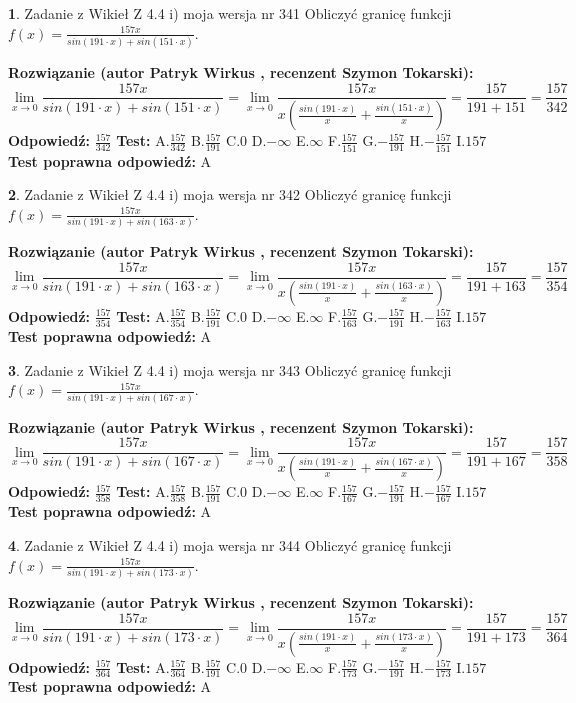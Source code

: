 \documentclass[12pt, a4paper]{article}
\theoremstyle{definition} %
\newtheorem{zad}{}
\newcommand{\zadStart}[1]{\begin{zad}#1\newline}
\newcommand{\zadStop}{\end{zad}}
\newcommand{\rozwStart}[2]{\noindent \textbf{Rozwiązanie (autor #1 , recenzent #2): }\newline}
\newcommand{\rozwStop}{\newline}
\newcommand{\odpStart}{\noindent \textbf{Odpowiedź:}\newline}
\newcommand{\odpStop}{\newline}
\newcommand{\testStart}{\noindent \textbf{Test:}\newline}
\newcommand{\testStop}{\newline}
\newcommand{\kluczStart}{\noindent \textbf{Test poprawna odpowiedź:}\newline}
\newcommand{\kluczStop}{\newline}
\begin{document}
\zadStart{Zadanie z Wikieł Z 4.4 i) moja wersja nr 341}
Obliczyć granicę funkcji $f(x)=\frac{157x}{sin(191\cdot x) +sin(151\cdot x)}$.
\zadStop
\rozwStart{Patryk Wirkus}{Szymon Tokarski}
$$\lim\limits_{x\to 0}\frac{157x}{sin(191\cdot x) +sin(151\cdot x)}=\lim\limits_{x\to 0}\frac{157x}{x(\frac{sin(191\cdot x)}{x}+\frac{sin(151\cdot x)}{x})}=\frac{157}{191+151} = \frac{157}{342}$$
\rozwStop
\odpStart
$\frac{157}{342}$
\odpStop
\testStart
A.$\frac{157}{342}$
B.$\frac{157}{191}$
C.$0$
D.$-\infty$
E.$\infty$
F.$\frac{157}{151}$
G.$-\frac{157}{191}$
H.$-\frac{157}{151}$
I.$157$
\testStop
\kluczStart
A
\kluczStop



\zadStart{Zadanie z Wikieł Z 4.4 i) moja wersja nr 342}
Obliczyć granicę funkcji $f(x)=\frac{157x}{sin(191\cdot x) +sin(163\cdot x)}$.
\zadStop
\rozwStart{Patryk Wirkus}{Szymon Tokarski}
$$\lim\limits_{x\to 0}\frac{157x}{sin(191\cdot x) +sin(163\cdot x)}=\lim\limits_{x\to 0}\frac{157x}{x(\frac{sin(191\cdot x)}{x}+\frac{sin(163\cdot x)}{x})}=\frac{157}{191+163} = \frac{157}{354}$$
\rozwStop
\odpStart
$\frac{157}{354}$
\odpStop
\testStart
A.$\frac{157}{354}$
B.$\frac{157}{191}$
C.$0$
D.$-\infty$
E.$\infty$
F.$\frac{157}{163}$
G.$-\frac{157}{191}$
H.$-\frac{157}{163}$
I.$157$
\testStop
\kluczStart
A
\kluczStop



\zadStart{Zadanie z Wikieł Z 4.4 i) moja wersja nr 343}
Obliczyć granicę funkcji $f(x)=\frac{157x}{sin(191\cdot x) +sin(167\cdot x)}$.
\zadStop
\rozwStart{Patryk Wirkus}{Szymon Tokarski}
$$\lim\limits_{x\to 0}\frac{157x}{sin(191\cdot x) +sin(167\cdot x)}=\lim\limits_{x\to 0}\frac{157x}{x(\frac{sin(191\cdot x)}{x}+\frac{sin(167\cdot x)}{x})}=\frac{157}{191+167} = \frac{157}{358}$$
\rozwStop
\odpStart
$\frac{157}{358}$
\odpStop
\testStart
A.$\frac{157}{358}$
B.$\frac{157}{191}$
C.$0$
D.$-\infty$
E.$\infty$
F.$\frac{157}{167}$
G.$-\frac{157}{191}$
H.$-\frac{157}{167}$
I.$157$
\testStop
\kluczStart
A
\kluczStop



\zadStart{Zadanie z Wikieł Z 4.4 i) moja wersja nr 344}
Obliczyć granicę funkcji $f(x)=\frac{157x}{sin(191\cdot x) +sin(173\cdot x)}$.
\zadStop
\rozwStart{Patryk Wirkus}{Szymon Tokarski}
$$\lim\limits_{x\to 0}\frac{157x}{sin(191\cdot x) +sin(173\cdot x)}=\lim\limits_{x\to 0}\frac{157x}{x(\frac{sin(191\cdot x)}{x}+\frac{sin(173\cdot x)}{x})}=\frac{157}{191+173} = \frac{157}{364}$$
\rozwStop
\odpStart
$\frac{157}{364}$
\odpStop
\testStart
A.$\frac{157}{364}$
B.$\frac{157}{191}$
C.$0$
D.$-\infty$
E.$\infty$
F.$\frac{157}{173}$
G.$-\frac{157}{191}$
H.$-\frac{157}{173}$
I.$157$
\testStop
\kluczStart
A
\kluczStop
\end{document}
